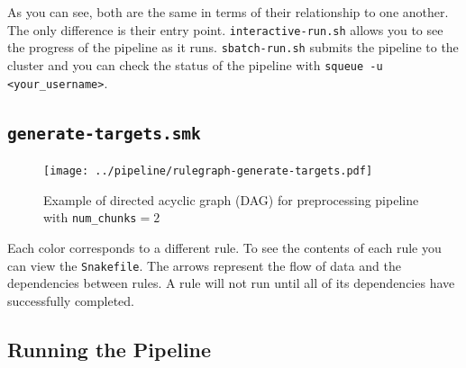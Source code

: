 \documentclass{article}
\begin{document}
    As you can see, both are the same in terms of their relationship to one another. The only difference is their entry point. \texttt{interactive-run.sh} allows you to see the progress of the pipeline as it runs. \texttt{sbatch-run.sh} submits the pipeline to the cluster and you can check the status of the pipeline with \texttt{squeue -u <your\_username>}.

    \subsection{\texttt{generate-targets.smk}}

    \begin{figure}[ht]
        \centering
        \texttt{[image: ../pipeline/rulegraph-generate-targets.pdf]}
        \caption[short]{Example of directed acyclic graph (DAG) for preprocessing pipeline with \texttt{num\_chunks}$=2$}
    \end{figure}

    \noindent Each color corresponds to a different rule. To see the contents of each rule you can view the \texttt{Snakefile}. The arrows represent the flow of data and the dependencies between rules. A rule will not run until all of its dependencies have successfully completed.

    \subsection{Running the Pipeline}
\end{document}
